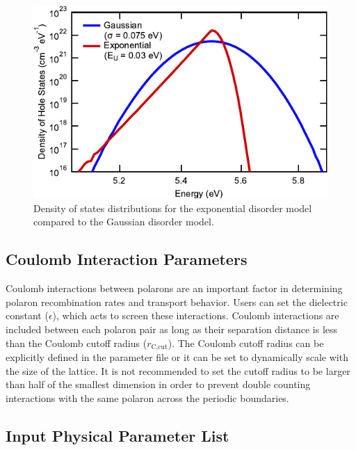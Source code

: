 \documentclass[%
 reprint,onecolumn,notitlepage,
superscriptaddress,longbibliography,
 amsmath,amssymb,
 aps,rmp,floatfix,
]{revtex4-1}
\begin{document}
\begin{figure}[h]
    \centering
    \includegraphics{DOS_shape_comparison.pdf}
    \caption{Density of states distributions for the exponential disorder model compared to the Gaussian disorder model.}
    \label{fig:exponential_dos}
\end{figure}

\subsection{Coulomb Interaction Parameters}

Coulomb interactions between polarons are an important factor in determining polaron recombination rates\cite{heiber2016prb} and transport behavior\cite{vanderholst2011prb}.
Users can set the dielectric constant ($\epsilon$), which acts to screen these interactions.
Coulomb interactions are included between each polaron pair as long as their separation distance is less than the Coulomb cutoff radius ($r_{\text{C,cut}}$).
The Coulomb cutoff radius can be explicitly defined in the parameter file or it can be set to dynamically scale with the size of the lattice.
It is not recommended to set the cutoff radius to be larger than half of the smallest dimension in order to prevent double counting interactions with the same polaron across the periodic boundaries.

\subsection{Input Physical Parameter List}
\end{document}
